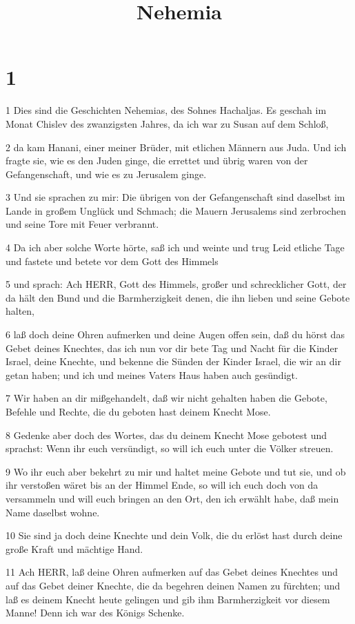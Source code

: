 

\title{Nehemia}


\chapter{1}

\par 1 Dies sind die Geschichten Nehemias, des Sohnes Hachaljas. Es geschah im Monat Chislev des zwanzigsten Jahres, da ich war zu Susan auf dem Schloß,
\par 2 da kam Hanani, einer meiner Brüder, mit etlichen Männern aus Juda. Und ich fragte sie, wie es den Juden ginge, die errettet und übrig waren von der Gefangenschaft, und wie es zu Jerusalem ginge.
\par 3 Und sie sprachen zu mir: Die übrigen von der Gefangenschaft sind daselbst im Lande in großem Unglück und Schmach; die Mauern Jerusalems sind zerbrochen und seine Tore mit Feuer verbrannt.
\par 4 Da ich aber solche Worte hörte, saß ich und weinte und trug Leid etliche Tage und fastete und betete vor dem Gott des Himmels
\par 5 und sprach: Ach HERR, Gott des Himmels, großer und schrecklicher Gott, der da hält den Bund und die Barmherzigkeit denen, die ihn lieben und seine Gebote halten,
\par 6 laß doch deine Ohren aufmerken und deine Augen offen sein, daß du hörst das Gebet deines Knechtes, das ich nun vor dir bete Tag und Nacht für die Kinder Israel, deine Knechte, und bekenne die Sünden der Kinder Israel, die wir an dir getan haben; und ich und meines Vaters Haus haben auch gesündigt.
\par 7 Wir haben an dir mißgehandelt, daß wir nicht gehalten haben die Gebote, Befehle und Rechte, die du geboten hast deinem Knecht Mose.
\par 8 Gedenke aber doch des Wortes, das du deinem Knecht Mose gebotest und sprachst: Wenn ihr euch versündigt, so will ich euch unter die Völker streuen.
\par 9 Wo ihr euch aber bekehrt zu mir und haltet meine Gebote und tut sie, und ob ihr verstoßen wäret bis an der Himmel Ende, so will ich euch doch von da versammeln und will euch bringen an den Ort, den ich erwählt habe, daß mein Name daselbst wohne.
\par 10 Sie sind ja doch deine Knechte und dein Volk, die du erlöst hast durch deine große Kraft und mächtige Hand.
\par 11 Ach HERR, laß deine Ohren aufmerken auf das Gebet deines Knechtes und auf das Gebet deiner Knechte, die da begehren deinen Namen zu fürchten; und laß es deinem Knecht heute gelingen und gib ihm Barmherzigkeit vor diesem Manne! Denn ich war des Königs Schenke.

